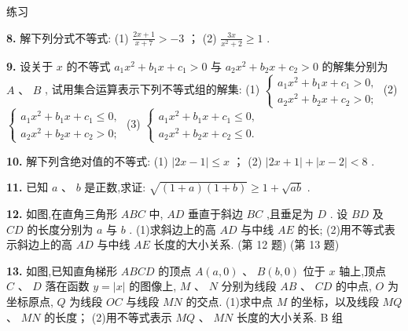\documentclass[a4paper,10pt,oneside,fontset=none]{ctexbook}
\renewcommand{\geq}{\geqslant}
\renewcommand{\leq}{\leqslant}
\newenvironment{exercise}[1][]{\begin{exBox}{练习}{#1}}{\end{exBox}}
\numberwithin{equation}{chapter}
\begin{document}
\begin{exercise}
\par\vspace{0.8em}
\textbf{8.} 解下列分式不等式: (1) $\frac{{2x} + 1}{x + 7} >  - 3$ ； (2) $\frac{3x}{{x}^{2} + 2} \geq  1$ .
\par\vspace{0.8em}
\textbf{9.} 设关于 $x$ 的不等式 ${a}_{1}{x}^{2} + {b}_{1}x + {c}_{1} > 0$ 与 ${a}_{2}{x}^{2} + {b}_{2}x + {c}_{2} > 0$ 的解集分别为 $A\text{ 、 }B$ , 试用集合运算表示下列不等式组的解集: (1) $\left\{  \begin{array}{l} {a}_{1}{x}^{2} + {b}_{1}x + {c}_{1} > 0, \\  {a}_{2}{x}^{2} + {b}_{2}x + {c}_{2} > 0; \end{array}\right.$ (2) $\left\{  \begin{array}{l} {a}_{1}{x}^{2} + {b}_{1}x + {c}_{1} \leq  0, \\  {a}_{2}{x}^{2} + {b}_{2}x + {c}_{2} > 0; \end{array}\right.$ (3) $\left\{  \begin{array}{l} {a}_{1}{x}^{2} + {b}_{1}x + {c}_{1} \leq  0, \\  {a}_{2}{x}^{2} + {b}_{2}x + {c}_{2} \leq  0. \end{array}\right.$
\par\vspace{0.8em}
\textbf{10.} 解下列含绝对值的不等式: (1) $\left| {{2x} - 1}\right|  \leq  x$ ； (2) $\left| {{2x} + 1}\right|  + \left| {x - 2}\right|  < 8$ .
\par\vspace{0.8em}
\textbf{11.} 已知 $a\text{ 、 }b$ 是正数,求证: $\sqrt{\left( {1 + a}\right) \left( {1 + b}\right) } \geq  1 + \sqrt{ab}$ .
\par\vspace{0.8em}
\textbf{12.} 如图,在直角三角形 ${ABC}$ 中, ${AD}$ 垂直于斜边 ${BC}$ ,且垂足为 $D$ . 设 ${BD}$ 及 ${CD}$ 的长度分别为 $a$ 与 $b$ . (1)求斜边上的高 ${AD}$ 与中线 ${AE}$ 的长; (2)用不等式表示斜边上的高 ${AD}$ 与中线 ${AE}$ 长度的大小关系. (第 12 题) (第 13 题)
\par\vspace{0.8em}
\textbf{13.} 如图,已知直角梯形 ${ABCD}$ 的顶点 $A\left( {a,0}\right) \text{ 、 }B\left( {b,0}\right)$ 位于 $x$ 轴上,顶点 $C\text{ 、 }D$ 落在函数 $y = \left| x\right|$ 的图像上, $M\text{ 、 }N$ 分别为线段 ${AB}\text{ 、 }{CD}$ 的中点, $O$ 为坐标原点, $Q$ 为线段 ${OC}$ 与线段 ${MN}$ 的交点. (1)求中点 $M$ 的坐标，以及线段 ${MQ}$ 、 ${MN}$ 的长度； (2)用不等式表示 ${MQ}$ 、 ${MN}$ 长度的大小关系. B 组
\par\vspace{0.8em}

\end{exercise}
\end{document}

